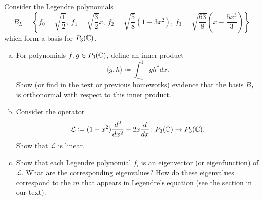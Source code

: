 \documentclass[12pt]{article} %
\begin{document}
\newpage
\begin{problem} Consider the Legendre polynomials
    \[
        B_L = \left\{f_0 = \sqrt{\frac{1}{2}}, ~ f_1 = \sqrt{\frac{3}{2}}x, ~ f_2 = \sqrt{\frac{5}{8}} (1-3x^2),~ f_3=\sqrt{\frac{63}{8}}\left(x-\frac{5x^3}{3}\right) \right\}
    \]
which form a basis for $P_3(\mathbb{C})$.
\begin{enumerate}[(a)]
    \item For polynomials $f,g\in P_3(\mathbb{C})$, define an inner product
    \[
\langle g,h\rangle \coloneqq \int_{-1}^1 gh^* dx.
\]
    Show (or find in the text or previous homeworks) evidence that the basis $B_L$ is orthonormal with respect to this inner product.
    \item Consider the operator
    \[
    \mathcal{L} \coloneqq (1-x^2)\frac{d^2}{dx^2} - 2x \frac{d}{dx} \colon P_3(\mathbb{C}) \to P_3(\mathbb{C}).
    \]
    Show that $\mathcal{L}$ is linear.
    \item Show that each Legendre polynomial $f_i$ is an eigenvector (or eigenfunction) of $\mathcal{L}$. What are the corresponding eigenvalues? How do these eigenvalues correspond to the $m$ that appears in Legendre's equation (see the section in our text).
\end{enumerate}
\end{problem}
\end{document}
